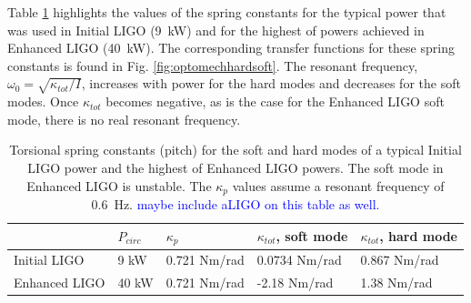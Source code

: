 Table \ref{table:k_tot} highlights the values of the spring constants
for the typical power that was used in Initial LIGO (9~kW) and for the
highest of powers achieved in Enhanced LIGO (40~kW). The corresponding
transfer functions for these spring constants is found in
Fig. \ref{fig:optomechhardsoft}. The resonant frequency, $\omega_0 =
\sqrt{\kappa_{tot}/I}$, increases with power for the hard modes and
decreases for the soft modes. Once $\kappa_{tot}$ becomes negative, as
is the case for the Enhanced LIGO soft mode, there is no real resonant
frequency.


\begin{table}
\centering
\caption[Torsional spring constants for the soft and hard cavity
modes]{Torsional spring constants (pitch) for the soft and hard modes
  of a typical Initial LIGO power and the highest of Enhanced LIGO
  powers. The soft mode in Enhanced LIGO is unstable. The $\kappa_p$
  values assume a resonant frequency of 0.6~Hz. \textcolor{blue}{maybe
  include aLIGO on this table as well.}}
\begin{tabular}{l l l l l}
\hline
 & $P_{circ}$ & $\kappa_{p}$ & $\kappa_{tot}$, soft mode &
 $\kappa_{tot}$, hard mode\\
\hline
Initial LIGO & 9 kW & 0.721 Nm/rad& 0.0734 Nm/rad & 0.867 Nm/rad\\
Enhanced LIGO & 40 kW & 0.721 Nm/rad& -2.18 Nm/rad & 1.38 Nm/rad\\
\hline
\end{tabular}
\label{table:k_tot}
\end{table}

